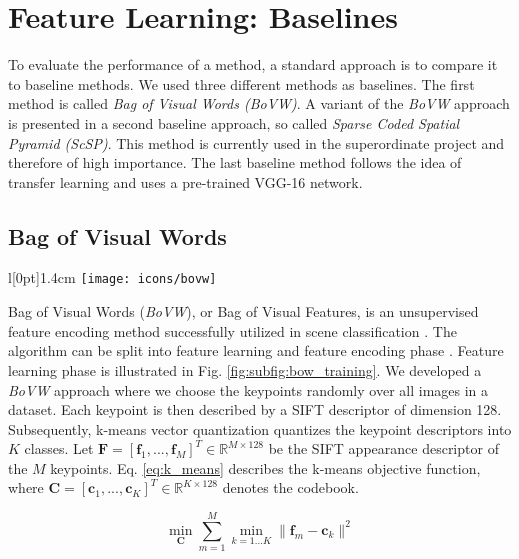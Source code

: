 \section{Feature Learning: Baselines} \label{ch:baselines}
To evaluate the performance of a method, a standard approach is to compare it to baseline methods. We used three different methods as baselines. The first method is called \textit{Bag of Visual Words (BoVW)}. A variant of the \textit{BoVW} approach is presented in a second baseline approach, so called \textit{Sparse Coded Spatial Pyramid (ScSP)}. This method is currently used in the superordinate project and therefore of high importance. The last baseline method follows the idea of transfer learning and uses a pre-trained VGG-16 network.

\subsection{Bag of Visual Words} \label{bow}
\begingroup
\setlength\intextsep{0pt}
\begin{wrapfigure}[4]{l}[0pt]{1.4cm}
\texttt{[image: icons/bovw]}
\end{wrapfigure}

Bag of Visual Words (\textit{BoVW}), or Bag of Visual Features, is an unsupervised feature encoding method successfully utilized in scene classification \cite{zhang15}.
The algorithm can be split into feature learning and feature encoding phase \cite{cheriyadat14}. Feature learning phase is illustrated in Fig. \ref{fig:subfig:bow_training}. We developed a \textit{BoVW} approach where we choose the keypoints randomly over all images in a dataset. Each keypoint is then described by a SIFT descriptor of dimension 128. Subsequently, k-means vector quantization quantizes the keypoint descriptors into $K$ classes. Let $\boldsymbol{F} = [\boldsymbol{f}_1,...,\boldsymbol{f}_M]^T \in \mathbb{R}^{M \times 128}$ be the SIFT appearance descriptor of the $M$ keypoints. Eq. \ref{eq:k_means} describes the k-means objective function, where $\boldsymbol{C} = [\boldsymbol{c}_1,...,\boldsymbol{c}_K]^T \in \mathbb{R}^{K \times 128}$ denotes the codebook.

\endgroup

\begin{equation}
   \min_{\boldsymbol{C}} \sum_{m=1}^M \min_{k=1...K} \|\boldsymbol{f}_m - \boldsymbol{c}_k\|^2
   \label{eq:k_means} 
\end{equation}
\vspace{6pt}

